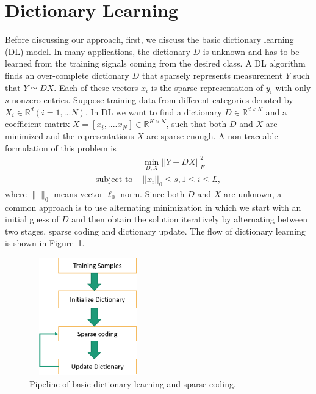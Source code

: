 \section{Dictionary Learning}
Before discussing our approach, first, we discuss the basic dictionary learning (DL) model.
In many applications, the dictionary $D$ is unknown and has to be learned from the training signals coming from the desired class. A DL algorithm finds an over-complete dictionary $D$ that sparsely represents measurement $Y$ such that $Y \simeq DX$. Each of these vectors $ x_i$ is the sparse representation of $y_i$ with only $s$ nonzero entries.
Suppose training data from different categories denoted by $X_i \in \mathbb{R}^d(i=1,...N)$. In DL we want to find a dictionary $D \in \mathbb{R}^{d \times K} $ and a coefficient matrix 
$X = [x_i,.... x_N] \in \mathbb{R}^{K \times N}$, such that both $D$ and $X$ are minimized and the representations $X$ are sparse enough. A non-traceable formulation of this problem is 
\begin{equation}
\begin{aligned}
& \underset{D,X} \min ||Y-DX||_F^2 \\
\text{subject to } &  ||x_i||_0 \leqslant s, 1 \leqslant i \leqslant L,
\end{aligned}
\label{eq:DL1}
\end{equation}
\noindent
where $\|\|_0$ means vector $\ell_0$ norm.
Since both $D$ and $X$ are unknown, a common approach is to use alternating minimization in which we start with an initial guess of $D$ and then obtain the solution iteratively by alternating between two stages, sparse coding and dictionary update. The flow of dictionary learning is shown in Figure~\ref{fig1:DLSC}.
\begin{figure}[!ht]
\centering
\includegraphics[width=2in,height=2in]{figures/DLpipeline}
\linebreak
\caption{Pipeline of basic dictionary learning and sparse coding.}
\label{fig1:DLSC}
\end{figure}

